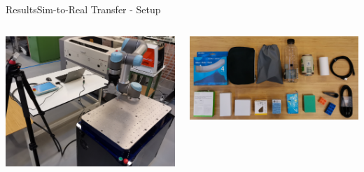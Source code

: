 \begin{frame}{Results}{Sim-to-Real Transfer - Setup}
    \begin{columns}%
        \begin{column}{0.45\textwidth}%
            \centering
            \includegraphics[width=\textwidth]{graphics/real_setup.png}
        \end{column}
        \begin{column}{0.55\textwidth}%
            \centering
            \includegraphics[width=\textwidth]{graphics/real_objects.png}
        \end{column}
    \end{columns}
\end{frame}

